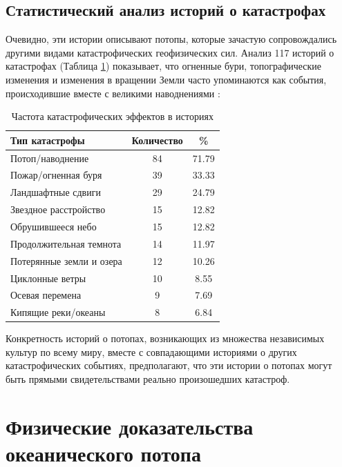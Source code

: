 \documentclass[10pt,twocolumn,letterpaper]{article}
\begin{document}
\subsection{Статистический анализ историй о катастрофах}

Очевидно, эти истории описывают потопы, которые зачастую сопровождались другими видами катастрофических геофизических сил. Анализ 117 историй о катастрофах (Таблица \ref{tab: 1}) показывает, что огненные бури, топографические изменения и изменения в вращении Земли часто упоминаются как события, происходившие вместе с великими наводнениями \cite{14}:

\begin{table}[ht]
\begin{center}
\renewcommand{\arraystretch}{1.2}  %
\begin{tabular}{|l|c|c|}
\hline
\textbf{Тип катастрофы} & \textbf{Количество} & \textbf{\%} \\
\hline\hline
Потоп/наводнение        & 84 & 71.79 \\
Пожар/огненная буря     & 39 & 33.33 \\
Ландшафтные сдвиги & 29 & 24.79 \\
Звездное расстройство   & 15 & 12.82 \\
Обрушившееся небо       & 15 & 12.82 \\
Продолжительная темнота & 14 & 11.97 \\
Потерянные земли и озера & 12 & 10.26 \\
Циклонные ветры         & 10 & 8.55  \\
Осевая перемена & 9 & 7.69  \\
Кипящие реки/океаны & 8 & 6.84 \\
\hline
\end{tabular}
\end{center}
\caption{Частота катастрофических эффектов в историях}
\label{tab: 1}
\end{table}

Конкретность историй о потопах, возникающих из множества независимых культур по всему миру, вместе с совпадающими историями о других катастрофических событиях, предполагают, что эти истории о потопах могут быть прямыми свидетельствами реально произошедших катастроф.

\section{Физические доказательства океанического потопа}
\end{document}
